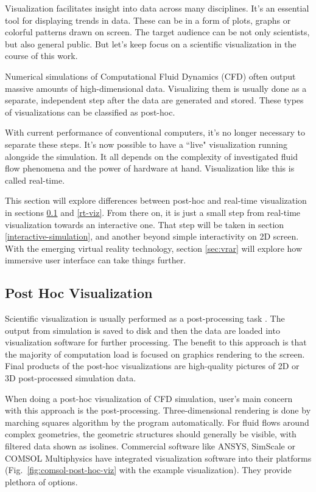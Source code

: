 Visualization facilitates insight into data across many disciplines. It's an essential tool for displaying trends in data. These can be in a form of plots, graphs or colorful patterns drawn on screen. The target audience can be not only scientists, but also general public. But let's keep focus on a scientific visualization in the course of this work. 

Numerical simulations of Computational Fluid Dynamics (CFD) often output massive amounts of high-dimensional data. Visualizing them is usually done as a separate, independent step after the data are generated and stored. These types of visualizations can be classified as post-hoc. 

With current performance of conventional computers, it's no longer necessary to separate these steps. It's now possible to have a ``live" visualization running alongside the simulation. It all depends on the complexity of investigated fluid flow phenomena and the power of hardware at hand. Visualization like this is called real-time.

This section will explore differences between post-hoc and real-time visualization in sections \ref{sec:post-hoc} and \ref{rt-viz}. From there on, it is just a small step from real-time visualization towards an interactive one. That step will be taken in section \ref{interactive-simulation}, and another beyond simple interactivity on 2D screen. With the emerging virtual reality technology, section \ref{sec:vrar} will explore how immersive user interface can take things further.

\subsection{Post Hoc Visualization}\label{sec:post-hoc}
Scientific visualization is usually performed as a post-processing task \citep{kressSituVisualizationTechniques}. The output from simulation is saved to disk and then the data are loaded into visualization software for further processing. The benefit to this approach is that the majority of computation load is focused on graphics rendering to the screen. Final products of the post-hoc visualizations are high-quality pictures of 2D or 3D post-processed simulation data.

When doing a post-hoc visualization of CFD simulation, user's main concern with this approach is the post-processing. Three-dimensional rendering is done by marching squares algorithm by the program automatically. For fluid flows around complex geometries, the geometric structures should generally be visible, with filtered data shown as isolines. Commercial software like ANSYS, SimScale or COMSOL Multiphysics have integrated visualization software into their platforms (Fig.~\ref{fig:comsol-post-hoc-viz} with the example visualization). They provide plethora of options.

